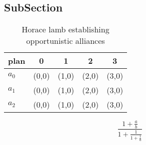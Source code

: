 \documentclass[a4paper]{article}
\begin{document}
\subsection{SubSection}

\begin{table}
\begin{adjustbox}{width=0.6\columnwidth}
\begin{tabular}{|l|l|l|l|l|}
\hline
\textbf{plan} & \multicolumn{1}{c|}{\textbf{0}} & \multicolumn{1}{c|}{\textbf{1}} & \multicolumn{1}{c|}{\textbf{2}} & \multicolumn{1}{c|}{\textbf{3}} \\ \hline
\textbf{$a_0$}  & (0,0) & (1,0) & (2,0) & (3,0) \\ \hline
\textbf{$a_1$}  & (0,0) & (1,0) & (2,0) & (3,0) \\ \hline
\textbf{$a_2$}  & (0,0) & (1,0) & (2,0) & (3,0) \\ \hline
\end{tabular}
\end{adjustbox}
\caption{Horace lamb establishing opportunistic alliances 
}
\end{table}

\[ \frac{1+\frac{a}{b}}{1+\frac{1}{1+\frac{1}{a}}} \]
\end{document}
